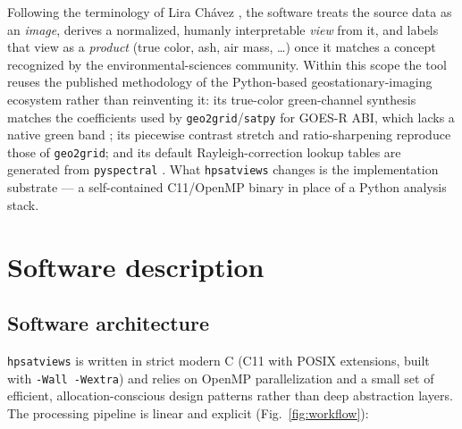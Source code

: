 \documentclass[preprint,12pt]{elsarticle}
\begin{document}
Following the terminology of Lira Ch\'avez \cite{LiraChavez2010}, the software
treats the source data as an \emph{image}, derives a normalized, humanly
interpretable \emph{view} from it, and labels that view as a \emph{product}
(true color, ash, air mass, \ldots) once it matches a concept recognized by
the environmental-sciences community. Within this scope the tool reuses the
published methodology of the Python-based geostationary-imaging ecosystem
rather than reinventing it: its true-color green-channel synthesis matches the
coefficients used by \texttt{geo2grid}/\texttt{satpy} for GOES-R ABI, which
lacks a native green band \cite{Bah2018,Miller2016}; its piecewise contrast
stretch and ratio-sharpening reproduce those of \texttt{geo2grid}; and its
default Rayleigh-correction lookup tables are generated from \texttt{pyspectral}
\cite{Scheirer2018,PySpectralLUT2018}. What \texttt{hpsatviews} changes is the
implementation substrate --- a self-contained C11/OpenMP binary in place of a
Python analysis stack.

\section{Software description}
\label{sec:description}

\subsection{Software architecture}
\label{sec:architecture}

\texttt{hpsatviews} is written in strict modern C (C11 with POSIX extensions,
built with \texttt{-Wall -Wextra}) and relies on OpenMP parallelization and a
small set of efficient, allocation-conscious design patterns rather than deep
abstraction layers. The processing pipeline is linear and explicit
(Fig.~\ref{fig:workflow}):
\end{document}
